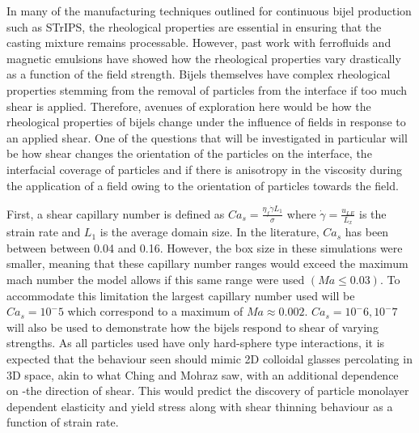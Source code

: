
In many of the manufacturing techniques outlined for continuous bijel production such as STrIPS, the rheological properties are essential in ensuring that the casting mixture remains processable. However, past work with ferrofluids and magnetic emulsions have showed how the rheological properties vary drastically as a function of the field strength. Bijels themselves have complex rheological properties stemming from the removal of particles from the interface if too much shear is applied. Therefore, avenues of exploration here would be how the rheological properties of bijels change under the influence of fields in response to an applied shear. One of the questions that will be investigated in particular will be how shear changes the orientation of the particles on the interface, the interfacial coverage of particles and if there is anisotropy in the viscosity during the application of a field owing to the orientation of particles towards the field.

First, a shear capillary number is defined as $Ca_s = \frac{\eta_{f} \dot{\gamma} L_{1}}{\sigma}$ where $\dot{\gamma} = \frac{u_{LE}}{L_x}$ is the strain rate and $L_1$ is the average domain size. \cite{frijters_effects_2012, yang_capillary_2022} In the literature, $Ca_s$ has been between between 0.04 and 0.16. However, the box size in these simulations were smaller, meaning that these capillary number ranges would exceed the maximum mach number the model allows if this same range were used $(Ma \leq 0.03)$. To accommodate this limitation the largest capillary number used will be $Ca_s = 10^-5$ which correspond to a maximum of $Ma \approx 0.002$. $Ca_s = 10^-6,  10^-7$ will also be used to demonstrate how the bijels respond to shear of varying strengths. As all particles used have only hard-sphere type interactions, it is expected that the behaviour seen should mimic 2D colloidal glasses percolating in 3D space, akin to what Ching and Mohraz saw, with an additional dependence on -the direction of shear. This would predict the discovery of particle monolayer dependent elasticity and yield stress along with shear thinning behaviour as a function of strain rate. 

